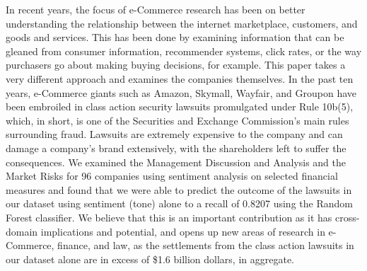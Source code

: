 In recent years, the focus of e-Commerce research has been on better understanding the relationship between the internet marketplace, customers, and goods and services. This has been done by examining information that can be gleaned from consumer information, recommender systems, click rates, or the way purchasers go about making buying decisions, for example. This paper takes a very different approach and examines the companies themselves. In the past ten years, e-Commerce giants such as Amazon, Skymall, Wayfair, and Groupon have been embroiled in class action security lawsuits promulgated under Rule 10b(5), which, in short, is one of the Securities and Exchange Commission's main rules surrounding fraud. Lawsuits are extremely expensive to the company and can damage a company's brand extensively, with the shareholders left to suffer the consequences. We examined the Management Discussion and Analysis and the Market Risks for 96 companies using sentiment analysis on selected financial measures and found that we were able to predict the outcome of the lawsuits in our dataset using sentiment (tone) alone to a recall of 0.8207 using the Random Forest classifier. We believe that this is an important contribution as it has cross-domain implications and potential, and opens up new areas of research in e-Commerce, finance, and law, as the settlements from the class action lawsuits in our dataset alone are in excess of \$1.6 billion dollars, in aggregate.

